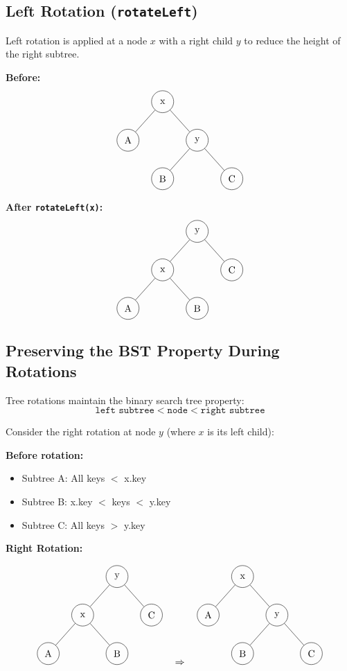 \documentclass{article}
\begin{document}
\subsection{Left Rotation (\texttt{rotateLeft})}

Left rotation is applied at a node $x$ with a right child $y$ to reduce the height of the right subtree.

\textbf{Before:}
\[
\begin{tikzpicture}[
  every node/.style={circle, draw, minimum size=0.8cm},
  level distance=1.4cm,
  level 1/.style={sibling distance=2.5cm}
]
\node (x) {x}
  child {node {A}}
  child {node (y) {y}
    child {node {B}}
    child {node {C}}
  };
\end{tikzpicture}
\]

\textbf{After \texttt{rotateLeft(x)}:}
\[
\begin{tikzpicture}[
  every node/.style={circle, draw, minimum size=0.8cm},
  level distance=1.4cm,
  level 1/.style={sibling distance=2.5cm}
]
\node (y) {y}
  child {node (x) {x}
    child {node {A}}
    child {node {B}}
  }
  child {node {C}};
\end{tikzpicture}
\]

\subsection{Preserving the BST Property During Rotations}

Tree rotations maintain the binary search tree property:
\[
\texttt{left subtree} < \texttt{node} < \texttt{right subtree}
\]

Consider the right rotation at node $y$ (where $x$ is its left child):

\textbf{Before rotation:}
\begin{itemize}
  \item Subtree A: All keys $<$ x.key
  \item Subtree B: x.key $<$ keys $<$ y.key
  \item Subtree C: All keys $>$ y.key
\end{itemize}

\textbf{Right Rotation:}

\[
\begin{tikzpicture}[
  every node/.style={circle, draw, minimum size=0.8cm},
  level distance=1.4cm,
  level 1/.style={sibling distance=2.5cm}
]
\node (y) {y}
  child {node (x) {x}
    child {node {A}}
    child {node {B}}
  }
  child {node {C}};
\end{tikzpicture}
\quad
\Rightarrow
\quad
\begin{tikzpicture}[
  every node/.style={circle, draw, minimum size=0.8cm},
  level distance=1.4cm,
  level 1/.style={sibling distance=2.5cm}
]
\node (x) {x}
  child {node {A}}
  child {node (y) {y}
    child {node {B}}
    child {node {C}}
  };
\end{tikzpicture}
\]
\end{document}

